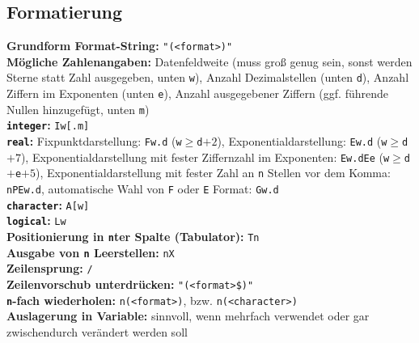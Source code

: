 \documentclass[a4paper, twocolumn]{scrarticle}
\begin{document}
 \subsection{Formatierung}
 \textbf{Grundform Format-String:} \lstinline|"(<format>)"|\\
 \textbf{Mögliche Zahlenangaben:}  Datenfeldweite (muss groß genug sein, sonst werden Sterne statt Zahl ausgegeben, unten \lstinline|w|), Anzahl Dezimalstellen (unten \lstinline|d|), Anzahl Ziffern im Exponenten (unten \lstinline|e|), Anzahl ausgegebener Ziffern (ggf. führende Nullen hinzugefügt, unten \lstinline|m|)\\
 \textbf{\lstinline|integer|:} \lstinline|Iw[.m]|\\
 \textbf{\lstinline|real|:} Fixpunktdarstellung: \lstinline|Fw.d| (\lstinline|w|$\geq$\lstinline|d|$+2$), Exponentialdarstellung: \lstinline|Ew.d| (\lstinline|w|$\geq$\lstinline|d|$+7$), Exponentialdarstellung mit fester Ziffernzahl im Exponenten: \lstinline|Ew.dEe| (\lstinline|w|$\geq$\lstinline|d|$+$\lstinline|e|$+5$), Exponentialdarstellung mit fester Zahl an \lstinline|n| Stellen vor dem Komma: \lstinline|nPEw.d|, automatische Wahl von \lstinline|F| oder \lstinline|E| Format: \lstinline|Gw.d|\\
 \textbf{\lstinline|character|:} \lstinline|A[w]|\\
 \textbf{\lstinline|logical|:} \lstinline|Lw|\\
 \textbf{Positionierung in \lstinline|n|ter Spalte (Tabulator):} \lstinline|Tn|\\
 \textbf{Ausgabe von \lstinline|n| Leerstellen:} \lstinline|nX|\\
 \textbf{Zeilensprung:} \lstinline|/|\\
 \textbf{Zeilenvorschub unterdrücken:} \lstinline|"(<format>$)"|\\
 \textbf{\lstinline|n|-fach wiederholen:} \lstinline|n(<format>)|, bzw. \lstinline|n(<character>)|\\
 \textbf{Auslagerung in Variable:} sinnvoll, wenn mehrfach verwendet oder gar zwischendurch verändert werden soll
 
\end{document}
